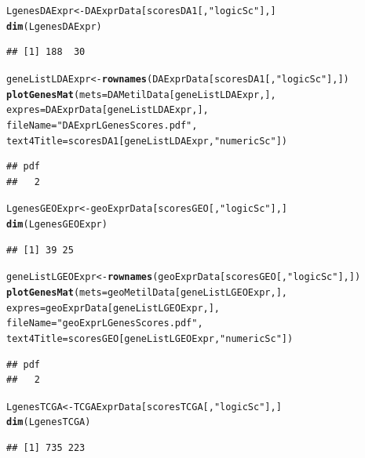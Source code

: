 \documentclass[a4paper,10pt]{article}\usepackage[]{graphicx}\usepackage[]{color}
\makeatletter
\newcommand{\hlstr}[1]{\textcolor[rgb]{0.192,0.494,0.8}{#1}}%
\newcommand{\hlstd}[1]{\textcolor[rgb]{0.345,0.345,0.345}{#1}}%
\newcommand{\hlkwb}[1]{\textcolor[rgb]{0.69,0.353,0.396}{#1}}%
\newcommand{\hlkwc}[1]{\textcolor[rgb]{0.333,0.667,0.333}{#1}}%
\newcommand{\hlkwd}[1]{\textcolor[rgb]{0.737,0.353,0.396}{\textbf{#1}}}%
\newenvironment{kframe}{%
 \def\at@end@of@kframe{}%
 \ifinner\ifhmode%
  \def\at@end@of@kframe{\end{minipage}}%
  \begin{minipage}{\columnwidth}%
 \fi\fi%
 \def\FrameCommand##1{\hskip\@totalleftmargin \hskip-\fboxsep
 \colorbox{shadecolor}{##1}\hskip-\fboxsep
     \hskip-\linewidth \hskip-\@totalleftmargin \hskip\columnwidth}%
 \MakeFramed {\advance\hsize-\width
   \@totalleftmargin\z@ \linewidth\hsize
   \@setminipage}}%
 {\par\unskip\endMakeFramed%
 \at@end@of@kframe}
\newenvironment{knitrout}{}{} %
\makeatother
\begin{document}
\begin{knitrout}
\color{fgcolor}\begin{kframe}
\begin{alltt}
\hlstd{LgenesDAExpr} \hlkwb{<-} \hlstd{DAExprData[scoresDA1[,}\hlstr{"logicSc"}\hlstd{],]}
\hlkwd{dim}\hlstd{(LgenesDAExpr)}
\end{alltt}
\begin{verbatim}
## [1] 188  30
\end{verbatim}
\begin{alltt}
\hlstd{geneListLDAExpr} \hlkwb{<-} \hlkwd{rownames}\hlstd{(DAExprData[scoresDA1[,}\hlstr{"logicSc"}\hlstd{],])}
\hlkwd{plotGenesMat} \hlstd{(}\hlkwc{mets}\hlstd{=DAMetilData[geneListLDAExpr,],}
              \hlkwc{expres}\hlstd{=DAExprData[geneListLDAExpr,],}
              \hlkwc{fileName} \hlstd{=}\hlstr{"DAExprLGenesScores.pdf"}\hlstd{,}
              \hlkwc{text4Title} \hlstd{= scoresDA1[geneListLDAExpr,}\hlstr{"numericSc"}\hlstd{])}
\end{alltt}
\begin{verbatim}
## pdf 
##   2
\end{verbatim}
\begin{alltt}
\hlstd{LgenesGEOExpr} \hlkwb{<-} \hlstd{geoExprData[scoresGEO[,}\hlstr{"logicSc"}\hlstd{],]}
\hlkwd{dim}\hlstd{(LgenesGEOExpr)}
\end{alltt}
\begin{verbatim}
## [1] 39 25
\end{verbatim}
\begin{alltt}
\hlstd{geneListLGEOExpr} \hlkwb{<-} \hlkwd{rownames}\hlstd{(geoExprData[scoresGEO[,}\hlstr{"logicSc"}\hlstd{],])}
\hlkwd{plotGenesMat} \hlstd{(}\hlkwc{mets}\hlstd{=geoMetilData[geneListLGEOExpr,],}
              \hlkwc{expres}\hlstd{=geoExprData[geneListLGEOExpr,],}
              \hlkwc{fileName} \hlstd{=}\hlstr{"geoExprLGenesScores.pdf"}\hlstd{,}
              \hlkwc{text4Title} \hlstd{= scoresGEO[geneListLGEOExpr,}\hlstr{"numericSc"}\hlstd{])}
\end{alltt}
\begin{verbatim}
## pdf 
##   2
\end{verbatim}
\begin{alltt}
\hlstd{LgenesTCGA} \hlkwb{<-} \hlstd{TCGAExprData[scoresTCGA[,}\hlstr{"logicSc"}\hlstd{],]}
\hlkwd{dim}\hlstd{(LgenesTCGA)}
\end{alltt}
\begin{verbatim}
## [1] 735 223
\end{verbatim}

\end{kframe}
\end{knitrout}
\end{document}
